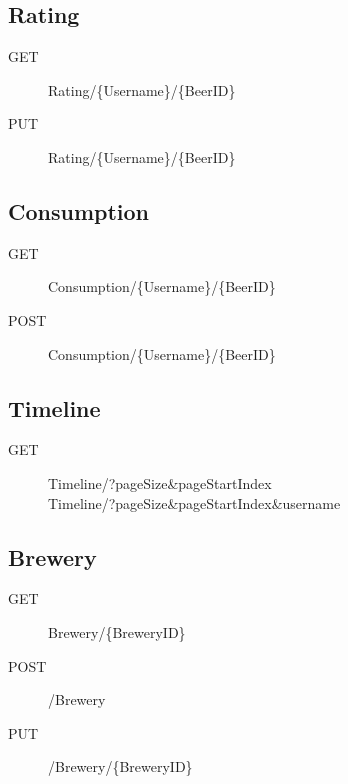 \documentclass[10pt,a4paper]{scrartcl}
\begin{document}
\subsection{Rating}
\begin{description}
\item[GET] Rating/\{Username\}/\{BeerID\}
\item[PUT] Rating/\{Username\}/\{BeerID\}
\end{description}

\subsection{Consumption}
\begin{description}
\item[GET] Consumption/\{Username\}/\{BeerID\}
\item[POST] Consumption/\{Username\}/\{BeerID\}
\end{description}

\subsection{Timeline}
\begin{description}
\item[GET] Timeline/?pageSize\&pageStartIndex
\\ Timeline/?pageSize\&pageStartIndex\&username
\end{description}

\subsection{Brewery}
\begin{description}
\item[GET] Brewery/\{BreweryID\}
\item[POST] /Brewery
\item[PUT] /Brewery/\{BreweryID\}
\end{description}
\end{document}
